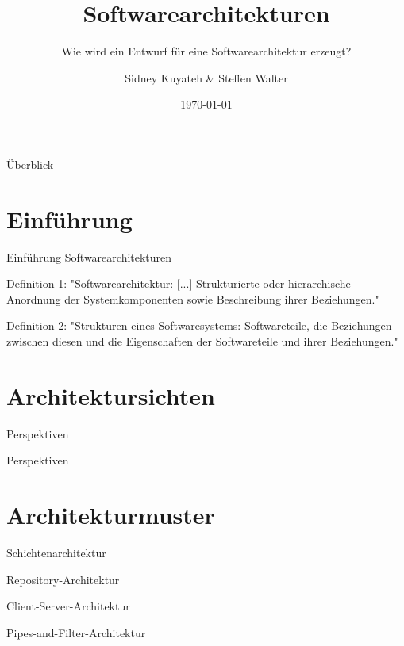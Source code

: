 \documentclass{beamer}
\title{Softwarearchitekturen}
\subtitle{Wie wird ein Entwurf für eine Softwarearchitektur erzeugt?}
\author{Sidney Kuyateh \& Steffen Walter}
\institute{Duale Hochschule Baden-Württemberg}
\date{\today}
\begin{document}
	\maketitle
	\begin{frame}{Überblick}
		\tableofcontents
	\end{frame}
		\section{Einführung}
		\begin{frame}{Einführung Softwarearchitekturen}
			\begin{block}{Definition 1:}
				"Softwarearchitektur: [...] Strukturierte oder hierarchische Anordnung der Systemkomponenten sowie Beschreibung ihrer Beziehungen." \cite[ S. 520]{balzert}
			\end{block}
			\begin{block}{Definition 2:}
				"Strukturen eines Softwaresystems: Softwareteile, die Beziehungen zwischen diesen und die Eigenschaften der Softwareteile und ihrer Beziehungen." \cite{clements}
			\end{block}
		\end{frame}
		\section{Architektursichten}
			\begin{frame}{Perspektiven}

			\end{frame}
			\begin{frame}{Perspektiven}
		
			\end{frame}
		\section{Architekturmuster}
			\begin{frame}{Schichtenarchitektur}
			
			\end{frame}
			\begin{frame}{Repository-Architektur}
			
			\end{frame}	
			\begin{frame}{Client-Server-Architektur}
			
			\end{frame}
			\begin{frame}{Pipes-and-Filter-Architektur}
			
			\end{frame}	
\end{document}

